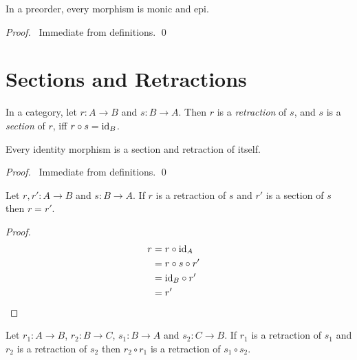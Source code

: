 \begin{prop}
    In a preorder, every morphism is monic and epi.
\end{prop}

\begin{proof}
    \pf\ Immediate from definitions. \qed
\end{proof}

\section{Sections and Retractions}

\begin{df}
    In a category, let $r : A \rightarrow B$ and $s : B \rightarrow A$. Then $r$ is a \emph{retraction} of $s$, and $s$ is a \emph{section} of $r$, iff $r \circ s = \mathrm{id}_{B}$.
\end{df}

\begin{prop}
    Every identity morphism is a section and retraction of itself.
\end{prop}

\begin{proof}
    \pf\ Immediate from definitions. \qed
\end{proof}

\begin{prop}
    \label{prop:retraction-is-section}
    Let $r,r' : A \rightarrow B$ and $s : B \rightarrow A$.
    If $r$ is a retraction of $s$ and $r'$ is a section of $s$ then $r = r'$.
\end{prop}

\begin{proof}
    \pf
    \begin{align*}
        r & = r \circ \mathrm{id}_{A}            \\
          & = r \circ s \circ r'        \\
          & = \mathrm{id}_{B} \circ r'           \\
          & = r'                 & \relax
    \end{align*}
\end{proof}

\begin{prop}
    \label{prop:retraction-comp}
    Let $r_1 : A \rightarrow B$, $r_2 : B \rightarrow C$, $s_1 : B \rightarrow A$ and $s_2 : C \rightarrow B$. If $r_1$ is a retraction of $s_1$ and $r_2$ is a retraction of $s_2$ then $r_2 \circ r_1$ is a retraction of $s_1 \circ s_2$.
\end{prop}

